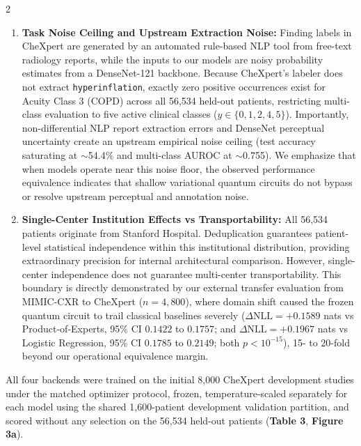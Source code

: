 \documentclass[10pt,a4paper,twoside]{article}
\begin{document}
\begin{multicols}{2}
\begin{enumerate}
  \item \textbf{Task Noise Ceiling and Upstream Extraction Noise:} Finding labels in CheXpert are generated by an automated rule-based NLP tool \cite{irvin2019} from free-text radiology reports, while the inputs to our models are noisy probability estimates from a DenseNet-121 backbone. Because CheXpert's labeler does not extract \texttt{hyperinflation}, exactly zero positive occurrences exist for Acuity Class 3 (COPD) across all 56,534 held-out patients, restricting multi-class evaluation to five active clinical classes ($y \in \{0, 1, 2, 4, 5\}$). Importantly, non-differential NLP report extraction errors and DenseNet perceptual uncertainty create an upstream empirical noise ceiling (test accuracy saturating at $\sim$54.4\% and multi-class AUROC at $\sim$0.755). We emphasize that when models operate near this noise floor, the observed performance equivalence indicates that shallow variational quantum circuits do not bypass or resolve upstream perceptual and annotation noise.
  \item \textbf{Single-Center Institution Effects vs Transportability:} All 56,534 patients originate from Stanford Hospital. Deduplication guarantees patient-level statistical independence within this institutional distribution, providing extraordinary precision for internal architectural comparison. However, single-center independence does not guarantee multi-center transportability. This boundary is directly demonstrated by our external transfer evaluation from MIMIC-CXR to CheXpert ($n = 4,800$), where domain shift caused the frozen quantum circuit to trail classical baselines severely ($\Delta\text{NLL} = \mathbf{+0.1589}$ nats vs Product-of-Experts, 95\% CI $0.1422$ to $0.1757$; and $\Delta\text{NLL} = \mathbf{+0.1967}$ nats vs Logistic Regression, 95\% CI $0.1785$ to $0.2149$; both $p < 10^{-15}$), 15- to 20-fold beyond our operational equivalence margin.
\end{enumerate}

All four backends were trained on the initial 8,000 CheXpert development studies under the matched optimizer protocol, frozen, temperature-scaled separately for each model using the shared 1,600-patient development validation partition, and scored without any selection on the 56,534 held-out patients (\textbf{Table 3}, \textbf{Figure 3a}).

\end{multicols}
\end{document}
